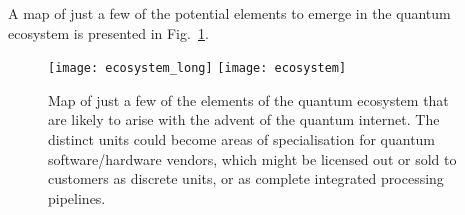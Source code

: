 A map of just a few of the potential elements to emerge in the quantum ecosystem is presented in Fig.~\ref{fig:ecosystem}.

\begin{figure}[!htpb]
\pubmode
\texttt{[image: ecosystem\_long]}
\else
\texttt{[image: ecosystem]}
\fi
\caption{Map of just a few of the elements of the quantum ecosystem that are likely to arise with the advent of the quantum internet. The distinct units could become areas of specialisation for quantum software/hardware vendors, which might be licensed out or sold to customers as discrete units, or as complete integrated processing pipelines.}\label{fig:ecosystem}	
\end{figure}